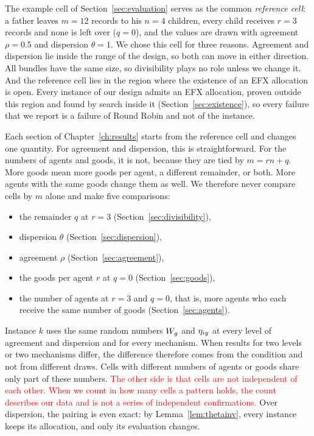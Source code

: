 The example cell of Section~\ref{sec:evaluation} serves as the common \textit{reference cell}: a
father leaves $m=12$ records to his $n=4$ children, every child receives $r=3$ records and none is
left over ($q=0$), and the values are drawn with agreement $\rho=0.5$ and dispersion $\theta=1$.
We chose this cell for three reasons. Agreement and dispersion lie inside the range of the design,
so both can move in either direction. All bundles have the same size, so divisibility plays no
role unless we change it. And the reference cell lies in the region where the existence of an EFX
allocation is open. Every instance of our design admits an EFX allocation, proven outside this
region and found by search inside it (Section~\ref{sec:existence}), so every failure that we
report is a failure of Round Robin and not of the instance.

Each section of Chapter~\ref{ch:results} starts from the reference cell and changes one quantity.
For agreement and dispersion, this is straightforward. For the numbers of agents and goods, it is
not, because they are tied by $m=rn+q$. More goods mean more goods per agent, a different
remainder, or both. More agents with the same goods change them as well. We therefore never
compare cells by $m$ alone and make five comparisons:
\begin{itemize}
  \item the remainder $q$ at $r=3$ (Section~\ref{sec:divisibility}),
  \item dispersion $\theta$ (Section~\ref{sec:dispersion}),
  \item agreement $\rho$ (Section~\ref{sec:agreement}),
  \item the goods per agent $r$ at $q=0$ (Section~\ref{sec:goods}),
  \item the number of agents at $r=3$ and $q=0$, that is, more agents who each receive the same
    number of goods (Section~\ref{sec:agents}).
\end{itemize}

Instance $k$ uses the same random numbers $W_g$ and $\eta_{ig}$ at every level of agreement and
dispersion and for every mechanism. When results for two levels or two mechanisms differ, the difference
therefore comes from the condition and not from different draws. Cells with different numbers of agents or goods
share only part of these numbers. \textcolor{red}{The other side is that cells are not independent of each other.
When we count in how many cells a pattern holds, the count describes our data and is not a series
of independent confirmations.} Over dispersion, the pairing is even exact: by
Lemma~\ref{lem:thetainv}, every instance keeps its allocation, and only its evaluation changes.

